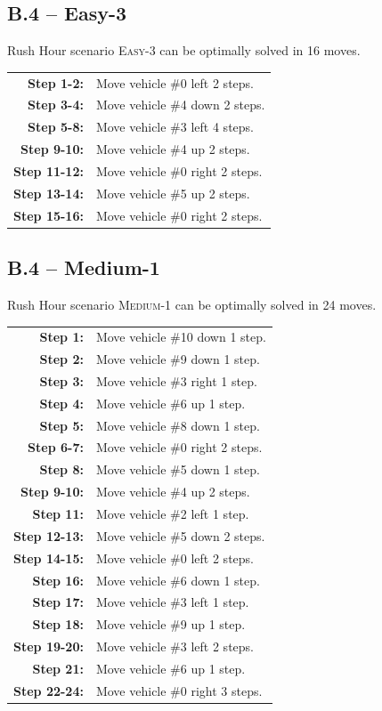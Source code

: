 \newpage
\subsection*{B.4 -- Easy-3}
\nobreak
\centering Rush Hour scenario \textsc{Easy-3} can be optimally solved in 16 moves.
\begin{longtable}{rl}
\textbf{Step 1-2:} & Move vehicle \#0 left 2 steps. \\
\textbf{Step 3-4:} & Move vehicle \#4 down 2 steps. \\
\textbf{Step 5-8:} & Move vehicle \#3 left 4 steps. \\
\textbf{Step 9-10:} & Move vehicle \#4 up 2 steps. \\
\textbf{Step 11-12:} & Move vehicle \#0 right 2 steps. \\
\textbf{Step 13-14:} & Move vehicle \#5 up 2 steps. \\
\textbf{Step 15-16:} & Move vehicle \#0 right 2 steps. \\
\end{longtable}

\subsection*{B.4 -- Medium-1}
\nobreak
\centering Rush Hour scenario \textsc{Medium-1} can be optimally solved in 24 moves.
\begin{longtable}{rl}
\textbf{Step 1:} & Move vehicle \#10 down 1 step. \\
\textbf{Step 2:} & Move vehicle \#9 down 1 step. \\
\textbf{Step 3:} & Move vehicle \#3 right 1 step. \\
\textbf{Step 4:} & Move vehicle \#6 up 1 step. \\
\textbf{Step 5:} & Move vehicle \#8 down 1 step. \\
\textbf{Step 6-7:} & Move vehicle \#0 right 2 steps. \\
\textbf{Step 8:} & Move vehicle \#5 down 1 step. \\
\textbf{Step 9-10:} & Move vehicle \#4 up 2 steps. \\
\textbf{Step 11:} & Move vehicle \#2 left 1 step. \\
\textbf{Step 12-13:} & Move vehicle \#5 down 2 steps. \\
\textbf{Step 14-15:} & Move vehicle \#0 left 2 steps. \\
\textbf{Step 16:} & Move vehicle \#6 down 1 step. \\
\textbf{Step 17:} & Move vehicle \#3 left 1 step. \\
\textbf{Step 18:} & Move vehicle \#9 up 1 step. \\
\textbf{Step 19-20:} & Move vehicle \#3 left 2 steps. \\
\textbf{Step 21:} & Move vehicle \#6 up 1 step. \\
\textbf{Step 22-24:} & Move vehicle \#0 right 3 steps. \\
\end{longtable}

